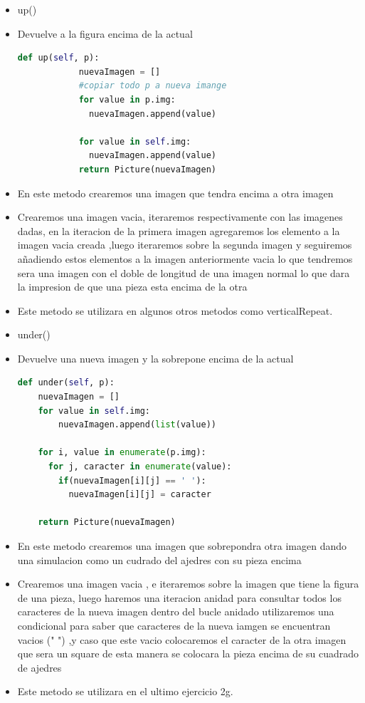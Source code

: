 \documentclass{article}
\begin{document}
\begin{itemize}
		 \item up()
		 \item Devuelve a la figura encima de la actual
		 \begin{lstlisting}[language=Python, caption={up}, float=H]
			def up(self, p):
			nuevaImagen = []
			#copiar todo p a nueva imange
			for value in p.img:
			  nuevaImagen.append(value)
			
			for value in self.img:
			  nuevaImagen.append(value)
			return Picture(nuevaImagen)		
		 \end{lstlisting}
		 \item En este metodo crearemos una imagen que tendra encima a otra imagen 
		 \item Crearemos una imagen vacia, iteraremos respectivamente con las imagenes dadas, en la iteracion de la primera imagen 
		       agregaremos los elemento a la imagen vacia creada ,luego iteraremos sobre la segunda imagen y seguiremos añadiendo estos elementos a la imagen anteriormente vacia
			   lo que tendremos sera una imagen con el doble de longitud de una imagen normal lo que dara la impresion de que una pieza esta encima de la otra  
		 \item Este metodo se utilizara en algunos otros metodos como verticalRepeat.
		 
		 \item under()
		 \item Devuelve una nueva imagen  y la sobrepone encima de la actual
		 \begin{lstlisting}[language=Python, caption={under}, float=H]
			def under(self, p):
    nuevaImagen = []
    for value in self.img:
        nuevaImagen.append(list(value))

    for i, value in enumerate(p.img):
      for j, caracter in enumerate(value):
        if(nuevaImagen[i][j] == ' '):
          nuevaImagen[i][j] = caracter

    return Picture(nuevaImagen)	
		 \end{lstlisting}
		 \item En este metodo crearemos una imagen que sobrepondra otra imagen dando una simulacion como un cudrado del ajedres con su pieza encima
		 \item Crearemos una imagen vacia , e iteraremos sobre la imagen que tiene la figura de una pieza, luego haremos una iteracion anidad para consultar todos los caracteres de la nueva imagen
		        dentro del bucle anidado utilizaremos una condicional para saber que caracteres de la nueva iamgen se encuentran vacios (" ") ,y caso que este vacio colocaremos el caracter de la otra imagen que sera 
				un square de esta manera se colocara la pieza encima de su cuadrado de ajedres
		 \item Este metodo se utilizara en el ultimo ejercicio 2g.
		 

\end{itemize}
\end{document}
